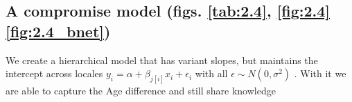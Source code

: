 \documentclass[11pt,a4paper,titlepage]{article}
\begin{document}
  \subsection{A compromise model (figs. \ref{tab:2.4}, \ref{fig:2.4} \ref{fig:2.4_bnet})}
 
  We create a hierarchical model \parencite{MultilevelHM} that has variant slopes, but maintains the intercept across locales \(y_i = \alpha + \beta_{j[i]} x_i + \epsilon_i \) with all \(\epsilon \sim N(0,\sigma^{2})\) \parencite{VaryingAlpha}. With it we are able to capture the Age difference and still share knowledge  

  \begin{figure}[htb]
    \centering

\end{figure}
\end{document}
